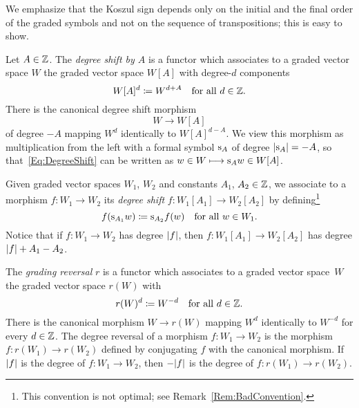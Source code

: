 \documentclass[\MainFolder/Text.tex]{subfiles}
\begin{document}
We emphasize that the Koszul sign depends only on the initial and the final order of the graded symbols and not on the sequence of transpositions; this is easy to show.



\begin{Definition}\label{Def:DegreeShift}
Let $A\in \mathbb{Z}$. The \emph{degree shift by $A$} is a functor which associates to a graded vector space $W$ the graded vector space $W[A]$ with degree-$d$ components
$$ W[A]^d \coloneqq W^{d+A}\quad \text{for all }d\in \mathbb{Z}.$$%
There is the canonical degree shift morphism 
\begin{equation}\label{Eq:DegreeShift}
 W\longrightarrow W[A]
\end{equation}
of degree $-A$ mapping $W^d$ identically to $W[A]^{d-A}$. We view this morphism as multiplication from the left with a formal symbol $\mathrm{s}_A$ of degree $|\mathrm{s}_A|=-A$, so that~\eqref{Eq:DegreeShift} can be written as $w\in W \longmapsto \mathrm{s}_A w\in W[A]$.

Given graded vector spaces $W_1$, $W_2$ and constants $A_1$, $A_2\in \mathbb{Z}$, we associate to a morphism $f: W_1 \rightarrow W_2$ its \emph{degree shift} $f: W_1[A_1] \rightarrow W_2[A_2]$ by defining\footnote{This convention is not optimal; see Remark~\ref{Rem:BadConvention}.}
\begin{equation}\label{Eq:DegreeShiftConv}
f(\mathrm{s}_{A_1} w) \coloneqq \mathrm{s}_{A_2} f(w)\quad\text{for all } w \in W_1.
\end{equation} 
Notice that if $f:W_1 \rightarrow W_2$ has degree $|f|$, then $f: W_1[A_1] \rightarrow W_2[A_2]$ has degree $|f| + A_1 - A_2$.

The \emph{grading reversal} $r$ is a functor which associates to a graded vector space~$W$ the graded vector space $r(W)$ with
$$ r(W)^d \coloneqq W^{-d}\quad\text{for all }d\in \mathbb{Z}. $$
There is the canonical morphism $W\rightarrow r(W)$ mapping $W^d$ identically to $W^{-d}$ for every $d\in \mathbb{Z}$. The degree reversal of a morphism $f: W_1 \rightarrow W_2$ is the morphism $f: r(W_1) \rightarrow  r(W_2)$ defined by conjugating $f$ with the canonical morphism. If $|f|$ is the degree of $f: W_1 \rightarrow W_2$, then $-|f|$ is the degree of $f: r(W_1) \rightarrow  r(W_2)$.
\end{Definition}
\end{document}
